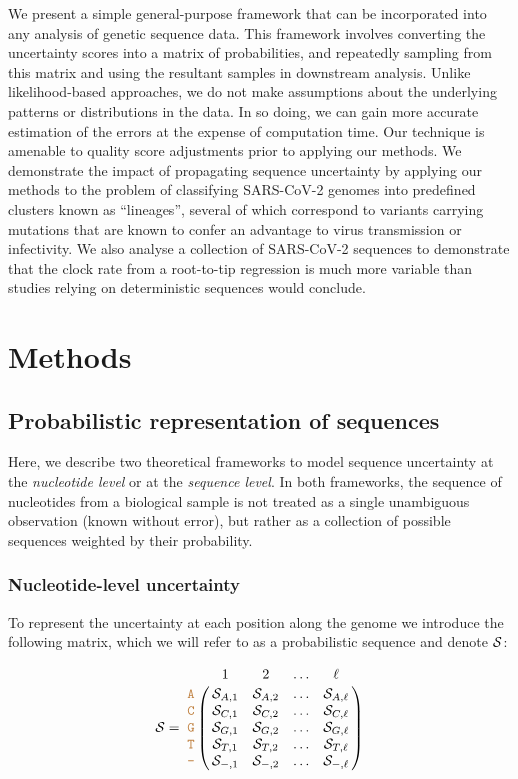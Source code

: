 \documentclass[10pt]{article}
\begin{document}
We present a simple general-purpose framework that can be incorporated into any analysis of genetic sequence data.
This framework involves converting the uncertainty scores into a matrix of probabilities, and repeatedly sampling from this matrix and using the resultant samples in downstream analysis.
Unlike likelihood-based approaches, we do not make assumptions about the underlying patterns or distributions in the data.
In so doing, we can gain more accurate estimation of the errors at the expense of computation time.
Our technique is amenable to quality score adjustments prior to applying our methods.
We demonstrate the impact of propagating sequence uncertainty by applying our methods to the problem of classifying SARS-CoV-2 genomes into predefined clusters known as ``lineages'', several of which correspond to variants carrying mutations that are known to confer an advantage to virus transmission or infectivity.
We also analyse a collection of SARS-CoV-2 sequences to demonstrate that the clock rate from a root-to-tip regression is much more variable than studies relying on deterministic sequences would conclude.



\section{Methods}

\subsection{Probabilistic representation of sequences}

Here, we describe two theoretical frameworks to model sequence uncertainty at the \emph{nucleotide level} or at the \emph{sequence level}.
In both frameworks, the sequence of nucleotides from a biological sample is not treated as a single unambiguous observation (known without error), but rather as a collection of possible sequences weighted by their probability.

\subsubsection{Nucleotide-level uncertainty}

To represent the uncertainty at each position along the genome we introduce the following matrix, which we will refer to as a probabilistic sequence and denote $\mathcal{S}$:

\begin{equation}
\nps = \bordermatrix{   & 1 & 2 & \ldots & \ell \cr
                \sq{A} & \nps_{A, 1} & \nps_{A, 2} & \ldots & \nps_{A, \ell} \cr
                \sq{C} & \nps_{C, 1} & \nps_{C, 2} & \ldots & \nps_{C, \ell} \cr
                \sq{G} & \nps_{G, 1} & \nps_{G, 2} & \ldots & \nps_{G, \ell} \cr
                \sq{T} & \nps_{T, 1} & \nps_{T, 2} & \ldots & \nps_{T, \ell} \cr 
                \sq{-} & \nps_{-, 1} & \nps_{-, 2} & \ldots & \nps_{-, \ell} \cr 
}\label{eq:nps}
\end{equation}
\end{document}
